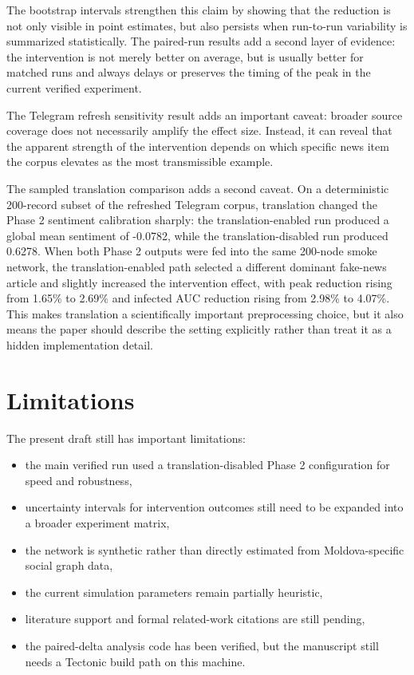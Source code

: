 \documentclass[11pt,a4paper]{article}
\begin{document}
The bootstrap intervals strengthen this claim by showing that the reduction is not only visible in point estimates, but also persists when run-to-run variability is summarized statistically. The paired-run results add a second layer of evidence: the intervention is not merely better on average, but is usually better for matched runs and always delays or preserves the timing of the peak in the current verified experiment.

The Telegram refresh sensitivity result adds an important caveat: broader source coverage does not necessarily amplify the effect size. Instead, it can reveal that the apparent strength of the intervention depends on which specific news item the corpus elevates as the most transmissible example.

The sampled translation comparison adds a second caveat. On a deterministic 200-record subset of the refreshed Telegram corpus, translation changed the Phase 2 sentiment calibration sharply: the translation-enabled run produced a global mean sentiment of -0.0782, while the translation-disabled run produced 0.6278. When both Phase 2 outputs were fed into the same 200-node smoke network, the translation-enabled path selected a different dominant fake-news article and slightly increased the intervention effect, with peak reduction rising from 1.65\% to 2.69\% and infected AUC reduction rising from 2.98\% to 4.07\%. This makes translation a scientifically important preprocessing choice, but it also means the paper should describe the setting explicitly rather than treat it as a hidden implementation detail.

\section{Limitations}
The present draft still has important limitations:

\begin{itemize}
  \item the main verified run used a translation-disabled Phase 2 configuration for speed and robustness,
  \item uncertainty intervals for intervention outcomes still need to be expanded into a broader experiment matrix,
  \item the network is synthetic rather than directly estimated from Moldova-specific social graph data,
  \item the current simulation parameters remain partially heuristic,
  \item literature support and formal related-work citations are still pending,
  \item the paired-delta analysis code has been verified, but the manuscript still needs a Tectonic build path on this machine.
\end{itemize}
\end{document}
